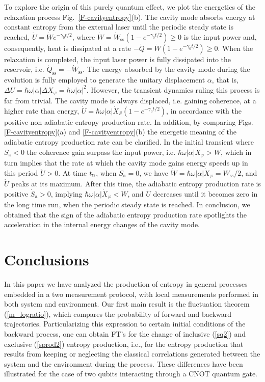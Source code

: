 \documentclass[aps,prx,twocolumn,showpacs,floatfix,superscriptaddress,graphics,longbibliography]{revtex4-1}
\begin{document}
To explore the origin of this purely quantum effect, we plot the energetics of the relaxation process  Fig.~\ref{F-cavityentropy}(b). The cavity mode absorbs energy at constant entropy from the external laser 
until the periodic steady state is reached, $\dot{U}= \dot{W}e^{- \gamma_0 t /2}$, where $\dot{W} = \dot{W}_{\mathrm{ss}}(1 - e^{-\gamma_0 t/2})\geq 0$ is the input power and, consequently,  heat is dissipated 
at a rate $ - \dot{Q} = \dot{W} (1- e^{-\gamma_0 t/2}) \geq 0$. When the relaxation is completed, the input laser power is fully dissipated into the reservoir, i.e. $\dot{Q}_{\mathrm{ss}} = - \dot{W}_{\mathrm{ss}}$. 
The energy absorbed by the cavity mode during the evolution is fully employed to generate the unitary displacement $\alpha$, that is, $\Delta U = \hbar\omega|\alpha| \Delta X_{\varphi} = \hbar \omega |\alpha|^2$. 
However, the transient dynamics ruling this process is far from trivial. The cavity mode is always displaced, i.e. gaining coherence, at a higher rate than energy, $\dot{U} = \hbar \omega |\alpha| \dot{X}_{\mathcal{S}} (1- e^{-\gamma_0 t/2})$, 
in accordance with the positive non-adiabatic entropy production rate. In addition, by comparing Figs. \ref{F-cavityentropy}(a) and \ref{F-cavityentropy}(b) the energetic meaning of the adiabatic 
entropy production rate can be clarified. In the initial transient where $\dot{S}_{\mathrm{a}} < 0$ the coherence gain surpass the input power, i.e. 
$\hbar \omega |\alpha| \dot{X}_{\varphi} > \dot{W}$, which in turn implies that the rate at which the cavity mode gains energy speeds up in this period $\ddot{U} > 0$. 
At time $t_{\rm n}$, when $\dot{S}_{\mathrm a}=0$, we have $\dot{W} = \hbar \omega |\alpha| \dot{X}_{\varphi} = \dot{W}_{\mathrm{ss}}/2$, and $\dot{U}$ peaks at its maximum. 
After this time, the adiabatic entropy production rate is positive $\dot{S}_{\mathrm a} >0$, implying $\hbar \omega |\alpha| \dot{X}_{\varphi} < \dot{W}$, and $\dot{U}$ 
decreases until it becomes zero in the long time run, when the periodic steady state is reached. In conclusion, we obtained that the sign of the adiabatic entropy 
production rate spotlights the acceleration in the internal energy changes of the cavity mode.



\section{Conclusions}  \label{S-Conclusions}

In this paper we have analyzed the production of entropy in general processes embedded in a two measurement protocol, with local measurements performed in both system and environment. 
Our first main result is the fluctuation theorem (\ref{m_logratio}), which compares the probability of forward and backward trajectories. 
Particularizing this expression to certain initial conditions of the backward process, one can obtain FT's for the change of inclusive (\ref{sq2}) and exclusive (\ref{sprod2}) entropy production, 
i.e., for the entropy production that results from keeping or neglecting the classical correlations generated between the system and the environment during the process. 
These differences have been illustrated for the case of two qubits interacting through a CNOT quantum gate.
\end{document}
